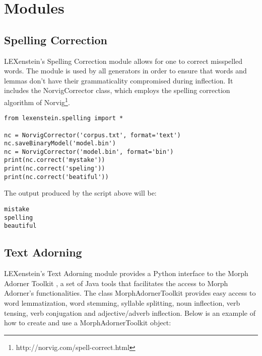 \chapter{Modules}
\label{modules}


\section{Spelling Correction}
\label{spelling}

LEXenstein's Spelling Correction module allows for one to correct misspelled words. The module is used by all generators in order to ensure that words and lemmas don't have their grammaticality compromised during inflection. It includes the NorvigCorrector class, which employs the spelling correction algorithm of Norvig\footnote{http://norvig.com/spell-correct.html}.

\begin{lstlisting}
from lexenstein.spelling import *

nc = NorvigCorrector('corpus.txt', format='text')
nc.saveBinaryModel('model.bin')
nc = NorvigCorrector('model.bin', format='bin')
print(nc.correct('mystake'))
print(nc.correct('speling'))
print(nc.correct('beatiful'))

\end{lstlisting}

The output produced by the script above will be:

\begin{lstlisting}
mistake
spelling
beautiful
\end{lstlisting}








\section{Text Adorning}
\label{adorning}

LEXenstein's Text Adorning module provides a Python interface to the Morph Adorner Toolkit \cite{Paetzold15mat}, a set of Java tools that facilitates the access to Morph Adorner's functionalities. The class MorphAdornerToolkit provides easy access to word lemmatization, word stemming, syllable splitting, noun inflection, verb tensing, verb conjugation and adjective/adverb inflection. Below is an example of how to create and use a MorphAdornerToolkit object:

